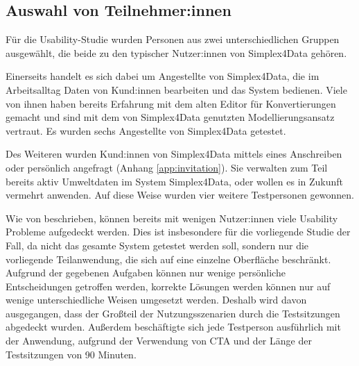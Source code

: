 \subsection{Auswahl von Teilnehmer:innen}

Für die Usability-Studie wurden Personen aus zwei unterschiedlichen Gruppen ausgewählt, die beide zu den typischer Nutzer:innen von Simplex4Data gehören.

Einerseits handelt es sich dabei um Angestellte von Simplex4Data, die im Arbeitsalltag Daten von Kund:innen bearbeiten und das System bedienen. Viele von ihnen haben bereits Erfahrung mit dem alten Editor für Konvertierungen gemacht und sind mit dem von Simplex4Data genutzten Modellierungsansatz vertraut. Es wurden sechs Angestellte von Simplex4Data getestet.

Des Weiteren wurden Kund:innen von Simplex4Data mittels eines Anschreiben oder persönlich angefragt (Anhang \ref{app:invitation}). Sie verwalten zum Teil bereits aktiv Umweltdaten im System Simplex4Data, oder wollen es in Zukunft vermehrt anwenden. Auf diese Weise wurden vier weitere Testpersonen gewonnen.

Wie von \textcite{nielsenWhyYou2000} beschrieben, können bereits mit wenigen Nutzer:innen viele Usability Probleme aufgedeckt werden. Dies ist insbesondere für die vorliegende Studie der Fall, da nicht das gesamte System getestet werden soll, sondern nur die vorliegende Teilanwendung, die sich auf eine einzelne Oberfläche beschränkt. Aufgrund der gegebenen Aufgaben können nur wenige persönliche Entscheidungen getroffen werden, korrekte Lösungen werden können nur auf wenige unterschiedliche Weisen umgesetzt werden. Deshalb wird davon ausgegangen, dass der Großteil der Nutzungsszenarien durch die Testsitzungen abgedeckt wurden. Außerdem beschäftigte sich jede Testperson ausführlich mit der Anwendung, aufgrund der Verwendung von \ac{CTA} und der Länge der Testsitzungen von 90 Minuten.
